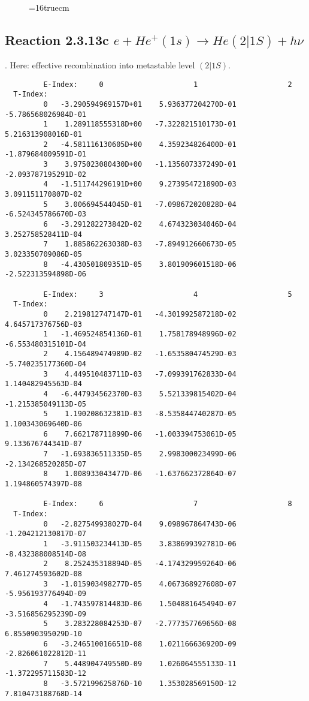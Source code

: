 \documentclass[12pt]{article}
\begin{document}
\begin{figure} \label{2.3.13b}
\epsfxsize=16truecm
\end{figure}
\newpage

\subsection{
Reaction 2.3.13c $ e + He^+(1s) \rightarrow He(2|1S) + h\nu$
}

\cite{kn:Fujimoto}. Here: effective recombination into metastable level
$(2|1S)$.

\begin{small}\begin{verbatim}
         E-Index:     0                     1                     2
  T-Index:
         0   -3.290594969157D+01    5.936377204270D-01   -5.786568026984D-01
         1    1.289118555318D+00   -7.322821510173D-01    5.216313908016D-01
         2   -4.581116130605D+00    4.359234826400D-01   -1.879684009591D-01
         3    3.975023080430D+00   -1.135607337249D-01   -2.093787195291D-02
         4   -1.511744296191D+00    9.273954721890D-03    3.091151170807D-02
         5    3.006694544045D-01   -7.098672020828D-04   -6.524345786670D-03
         6   -3.291282273842D-02    4.674323034046D-04    3.252758528411D-04
         7    1.885862263038D-03   -7.894912660673D-05    3.023350709086D-05
         8   -4.430501809351D-05    3.801909601518D-06   -2.522313594898D-06

         E-Index:     3                     4                     5
  T-Index:
         0    2.219812747147D-01   -4.301992587218D-02    4.645717376756D-03
         1   -1.469524854136D-01    1.758178948996D-02   -6.553480315101D-04
         2    4.156489474989D-02   -1.653580474529D-03   -5.740235177360D-04
         3    4.449510483711D-03   -7.099391762833D-04    1.140482945563D-04
         4   -6.447934562370D-03    5.521339815402D-04   -1.215385049113D-05
         5    1.190208632381D-03   -8.535844740287D-05    1.100343069640D-06
         6    7.662178711899D-06   -1.003394753061D-05    9.133676744341D-07
         7   -1.693836511335D-05    2.998300023499D-06   -2.134268520285D-07
         8    1.008933043477D-06   -1.637662372864D-07    1.194860574397D-08

         E-Index:     6                     7                     8
  T-Index:
         0   -2.827549938027D-04    9.098967864743D-06   -1.204212130817D-07
         1   -3.911503234413D-05    3.838699392781D-06   -8.432388008514D-08
         2    8.252435318894D-05   -4.174329959264D-06    7.461274593602D-08
         3   -1.015903498277D-05    4.067368927608D-07   -5.956193776494D-09
         4   -1.743597814483D-06    1.504881645494D-07   -3.516856295239D-09
         5    3.283228084253D-07   -2.777357769656D-08    6.855090395029D-10
         6   -3.246510016651D-08    1.021166636920D-09   -2.826061022812D-11
         7    5.448904749550D-09    1.026064555133D-11   -1.372295711583D-12
         8   -3.572199625876D-10    1.353028569150D-12    7.810473188768D-14


\end{verbatim}
\end{small}
\end{document}
